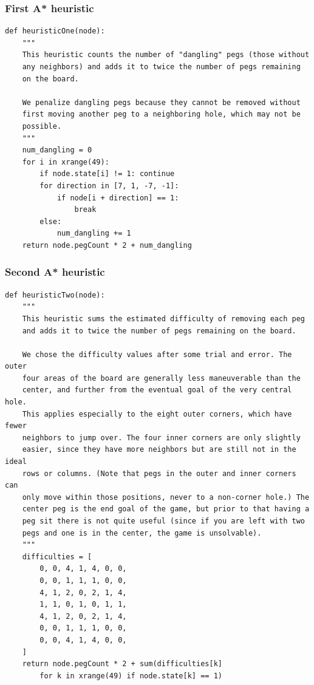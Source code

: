 \documentclass[11pt]{article}
\begin{document}
\subsubsection{First A* heuristic}

\lstset{language=Python}
\begin{lstlisting}[frame=single]
def heuristicOne(node):
	"""
	This heuristic counts the number of "dangling" pegs (those without
	any neighbors) and adds it to twice the number of pegs remaining
	on the board.

	We penalize dangling pegs because they cannot be removed without
	first moving another peg to a neighboring hole, which may not be
	possible.
	"""
	num_dangling = 0
	for i in xrange(49):
		if node.state[i] != 1: continue
		for direction in [7, 1, -7, -1]:
			if node[i + direction] == 1:
				break
		else:
			num_dangling += 1
	return node.pegCount * 2 + num_dangling
\end{lstlisting}

\subsubsection{Second A* heuristic}

\lstset{language=Python}
\begin{lstlisting}[frame=single]
def heuristicTwo(node):
	"""
	This heuristic sums the estimated difficulty of removing each peg
	and adds it to twice the number of pegs remaining on the board.

	We chose the difficulty values after some trial and error. The outer
	four areas of the board are generally less maneuverable than the
	center, and further from the eventual goal of the very central hole.
	This applies especially to the eight outer corners, which have fewer
	neighbors to jump over. The four inner corners are only slightly
	easier, since they have more neighbors but are still not in the ideal
	rows or columns. (Note that pegs in the outer and inner corners can
	only move within those positions, never to a non-corner hole.) The
	center peg is the end goal of the game, but prior to that having a
	peg sit there is not quite useful (since if you are left with two
	pegs and one is in the center, the game is unsolvable).
	"""
	difficulties = [
		0, 0, 4, 1, 4, 0, 0,
		0, 0, 1, 1, 1, 0, 0,
		4, 1, 2, 0, 2, 1, 4,
		1, 1, 0, 1, 0, 1, 1,
		4, 1, 2, 0, 2, 1, 4,
		0, 0, 1, 1, 1, 0, 0,
		0, 0, 4, 1, 4, 0, 0,
	]
	return node.pegCount * 2 + sum(difficulties[k]
		for k in xrange(49) if node.state[k] == 1)
\end{lstlisting}
\end{document}
